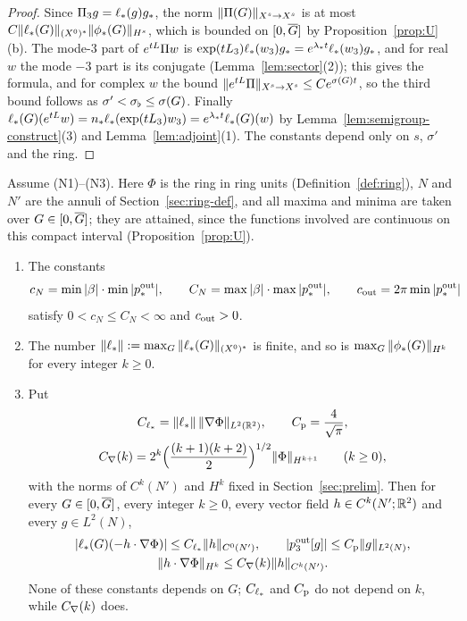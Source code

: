 \begin{proof}
Since $\Pi_3g=\ell_*(g)g_*$, the norm
$\|\Pi(G)\|_{X^s\to X^s}$ is at most $C\|\ell_*(G)\|_{(X^0)^*}\|\phi_*(G)\|_{H^s}$, which is
bounded on $[0,\overline{G}]$ by Proposition~\ref{prop:U}(b). The mode-$3$ part of
$e^{tL}\Pi w$ is $\exp(tL_{3})\ell_*(w_3)g_*=e^{\lambda_* t}\ell_*(w_3)g_*$, and
for real $w$ the mode $-3$ part is its conjugate (Lemma~\ref{lem:sector}(2));
this gives the formula, and for
complex $w$ the bound $\|e^{tL}\Pi\|_{X^s\to X^s}\le Ce^{\sigma(G)t}$, so the
third bound follows as $\sigma'<\sigma_\flat\le\sigma(G)$. Finally
$\ell_*(G)(e^{tL}w)=n_*\ell_*(\exp(tL_{3})w_3)=e^{\lambda_* t}\ell_*(G)(w)$ by
Lemma~\ref{lem:semigroup-construct}(3) and Lemma~\ref{lem:adjoint}(1). The constants
depend only on $s$, $\sigma'$ and the ring.
\end{proof}

\begin{lemma}
\label{lem:uniform}
Assume \textup{(N1)}--\textup{(N3)}. Here $\Phi$ is the ring in ring units
(Definition~\ref{def:ring}), $N$ and $N'$ are the annuli of Section~\ref{sec:ring-def},
and all maxima and minima are taken over $G\in[0,\overline{G}]$; they are attained, since the functions involved are continuous
on this compact interval (Proposition~\ref{prop:U}).
\begin{enumerate}[label=\textup{(\arabic*)}]
\item The constants
  \[
  c_N=\min|\beta|\cdot\min|p^{\mathrm{out}}_*|,\qquad
  C_N=\max|\beta|\cdot\max|p^{\mathrm{out}}_*|,\qquad
  c_{\mathrm{out}}=2\pi\min|p^{\mathrm{out}}_*|
  \]
  satisfy $0<c_N\le C_N<\infty$ and $c_{\mathrm{out}}>0$.
\item The number $\|\ell_*\|:=\max_G\|\ell_*(G)\|_{(X^0)^*}$ is finite, and so is
  $\max_G\|\phi_*(G)\|_{H^k}$ for every integer $k\ge0$.
\item Put
  \[
  \begin{gathered}
  C_{\ell_*}=\|\ell_*\|\,\|\nabla\Phi\|_{L^2(\mathbb{R}^2)},\qquad C_{\mathrm{p}}=\frac4{\sqrt\pi},\\
  C_{\nabla}(k)=2^k\Big(\frac{(k+1)(k+2)}2\Big)^{1/2}\|\Phi\|_{H^{k+1}}\qquad(k\ge0),
  \end{gathered}
  \]
  with the norms of $C^k(N')$ and $H^k$ fixed in Section~\ref{sec:prelim}. Then for
  every $G\in[0,\overline{G}]$, every integer $k\ge0$, every vector field
  $h\in C^k(N';\mathbb{R}^2)$ and every $g\in L^2(N)$,
  \[
  \begin{gathered}
  |\ell_*(G)(-h\cdot\nabla\Phi)|\le C_{\ell_*}\|h\|_{C^0(N')},\qquad
  |p^{\mathrm{out}}_3[g]|\le C_{\mathrm{p}}\|g\|_{L^2(N)},\\
  \|h\cdot\nabla\Phi\|_{H^k}\le C_{\nabla}(k)\|h\|_{C^k(N')} .
  \end{gathered}
  \]
  None of these constants depends on $G$; $C_{\ell_*}$ and $C_{\mathrm{p}}$ do not depend on $k$,
  while $C_{\nabla}(k)$ does.
\end{enumerate}
\end{lemma}
